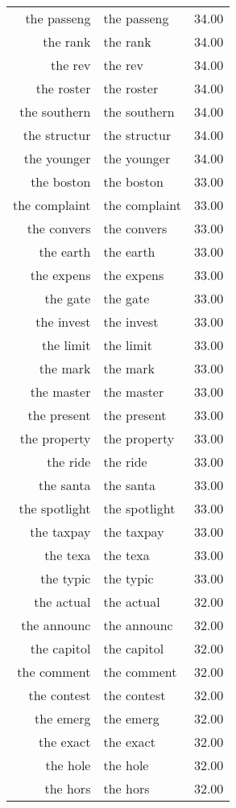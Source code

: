 \begin{table}[ht]
\begin{tabular}{rlr}
  the passeng & the passeng & 34.00 \\ 
  the rank & the rank & 34.00 \\ 
  the rev & the rev & 34.00 \\ 
  the roster & the roster & 34.00 \\ 
  the southern & the southern & 34.00 \\ 
  the structur & the structur & 34.00 \\ 
  the younger & the younger & 34.00 \\ 
  the boston & the boston & 33.00 \\ 
  the complaint & the complaint & 33.00 \\ 
  the convers & the convers & 33.00 \\ 
  the earth & the earth & 33.00 \\ 
  the expens & the expens & 33.00 \\ 
  the gate & the gate & 33.00 \\ 
  the invest & the invest & 33.00 \\ 
  the limit & the limit & 33.00 \\ 
  the mark & the mark & 33.00 \\ 
  the master & the master & 33.00 \\ 
  the present & the present & 33.00 \\ 
  the property & the property & 33.00 \\ 
  the ride & the ride & 33.00 \\ 
  the santa & the santa & 33.00 \\ 
  the spotlight & the spotlight & 33.00 \\ 
  the taxpay & the taxpay & 33.00 \\ 
  the texa & the texa & 33.00 \\ 
  the typic & the typic & 33.00 \\ 
  the actual & the actual & 32.00 \\ 
  the announc & the announc & 32.00 \\ 
  the capitol & the capitol & 32.00 \\ 
  the comment & the comment & 32.00 \\ 
  the contest & the contest & 32.00 \\ 
  the emerg & the emerg & 32.00 \\ 
  the exact & the exact & 32.00 \\ 
  the hole & the hole & 32.00 \\ 
  the hors & the hors & 32.00 \\ 

\end{tabular}
\end{table}
